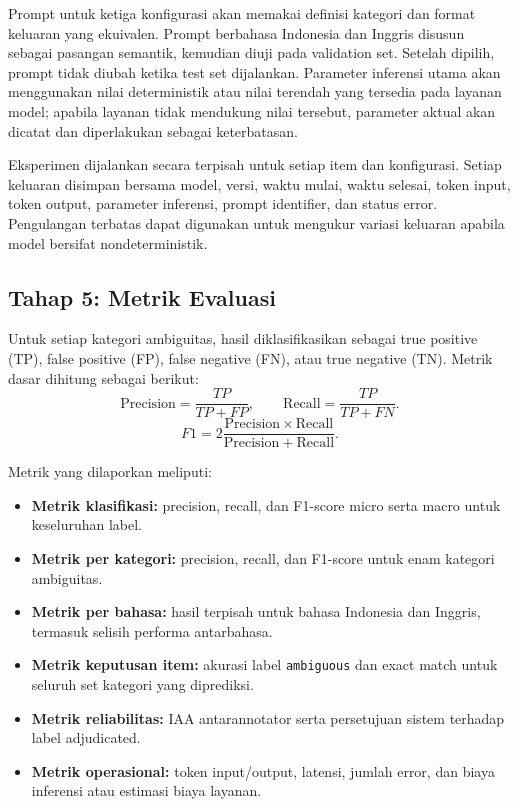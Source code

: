 Prompt untuk ketiga konfigurasi akan memakai definisi kategori dan format keluaran yang ekuivalen. Prompt berbahasa Indonesia dan Inggris disusun sebagai pasangan semantik, kemudian diuji pada validation set. Setelah dipilih, prompt tidak diubah ketika test set dijalankan. Parameter inferensi utama akan menggunakan nilai deterministik atau nilai terendah yang tersedia pada layanan model; apabila layanan tidak mendukung nilai tersebut, parameter aktual akan dicatat dan diperlakukan sebagai keterbatasan.

Eksperimen dijalankan secara terpisah untuk setiap item dan konfigurasi. Setiap keluaran disimpan bersama model, versi, waktu mulai, waktu selesai, token input, token output, parameter inferensi, prompt identifier, dan status error. Pengulangan terbatas dapat digunakan untuk mengukur variasi keluaran apabila model bersifat nondeterministik.

\subsection{Tahap 5: Metrik Evaluasi}

Untuk setiap kategori ambiguitas, hasil diklasifikasikan sebagai true positive (TP), false positive (FP), false negative (FN), atau true negative (TN). Metrik dasar dihitung sebagai berikut:
\[
\mathrm{Precision}=\frac{TP}{TP+FP}, \qquad
\mathrm{Recall}=\frac{TP}{TP+FN}.
\]
\[
F1=2\frac{\mathrm{Precision}\times\mathrm{Recall}}{\mathrm{Precision}+\mathrm{Recall}}.
\]

Metrik yang dilaporkan meliputi:
\begin{itemize}
\item \textbf{Metrik klasifikasi:} precision, recall, dan F1-score micro serta macro untuk keseluruhan label.
\item \textbf{Metrik per kategori:} precision, recall, dan F1-score untuk enam kategori ambiguitas.
\item \textbf{Metrik per bahasa:} hasil terpisah untuk bahasa Indonesia dan Inggris, termasuk selisih performa antarbahasa.
\item \textbf{Metrik keputusan item:} akurasi label \texttt{ambiguous} dan exact match untuk seluruh set kategori yang diprediksi.
\item \textbf{Metrik reliabilitas:} IAA antarannotator serta persetujuan sistem terhadap label adjudicated.
\item \textbf{Metrik operasional:} token input/output, latensi, jumlah error, dan biaya inferensi atau estimasi biaya layanan.
\end{itemize}


